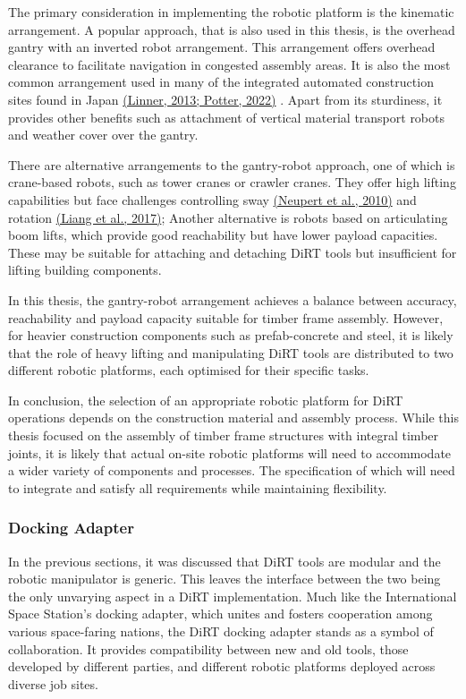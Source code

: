 \documentclass[11pt]{book}
\begin{document}
\vspace{3\baselineskip}
The primary consideration in implementing the robotic platform is the kinematic arrangement. A popular approach, that is also used in this thesis, is the overhead gantry with an inverted robot arrangement. This arrangement offers overhead clearance to facilitate navigation in congested assembly areas. It is also the most common arrangement used in many of the integrated automated construction sites found in Japan \href{https://www.zotero.org/google-docs/?EF3GMo}{(Linner, 2013; Potter, 2022)} . Apart from its sturdiness, it provides other benefits such as attachment of vertical material transport robots and weather cover over the gantry.

There are alternative arrangements to the gantry-robot approach, one of which is crane-based robots, such as tower cranes or crawler cranes. They offer high lifting capabilities but face challenges controlling sway \href{https://www.zotero.org/google-docs/?Cg17jt}{(Neupert et al., 2010)} and rotation \href{https://www.zotero.org/google-docs/?xytkc0}{(Liang et al., 2017)}; Another alternative is robots based on articulating boom lifts, which provide good reachability but have lower payload capacities. These may be suitable for attaching and detaching DiRT tools but insufficient for lifting building components. 

In this thesis, the gantry-robot arrangement achieves a balance between accuracy, reachability and payload capacity suitable for timber frame assembly. However, for heavier construction components such as prefab-concrete and steel, it is likely that the role of heavy lifting and manipulating DiRT tools are distributed to two different robotic platforms, each optimised for their specific tasks.

In conclusion, the selection of an appropriate robotic platform for DiRT operations depends on the construction material and assembly process. While this thesis focused on the assembly of timber frame structures with integral timber joints, it is likely that actual on-site robotic platforms will need to accommodate a wider variety of components and processes. The specification of which will need to integrate and satisfy all requirements while maintaining flexibility.

\subsubsection{Docking Adapter}

In the previous sections, it was discussed that DiRT tools are modular and the robotic manipulator is generic. This leaves the interface between the two being the only unvarying aspect in a DiRT implementation. Much like the International Space Station's docking adapter, which unites and fosters cooperation among various space-faring nations, the DiRT docking adapter stands as a symbol of collaboration. It provides compatibility between new and old tools, those developed by different parties, and different robotic platforms deployed across diverse job sites.
\end{document}
